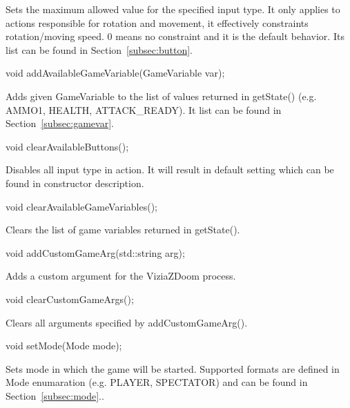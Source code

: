 Sets the maximum allowed value for the specified input type. It only applies to actions responsible for rotation and movement, it effectively constraints rotation/moving speed.
0 means no constraint and it is the default behavior. Its list can be found in Section~\ref{subsec:button}.


\vspace{20pt}
\begin{clinee}
void addAvailableGameVariable(GameVariable var);
\end{clinee}

Adds given GameVariable to the list of values returned in getState() (e.g. AMMO1, HEALTH, ATTACK\_READY). It list can be found in Section~\ref{subsec:gamevar}.


\vspace{20pt}
\begin{clinee}
void clearAvailableButtons();
\end{clinee}

Disables all input type in action. It will result in default setting which can be found in constructor description.


\vspace{20pt}
\begin{clinee}
void clearAvailableGameVariables();
\end{clinee}

Clears the list of game variables returned in getState().


\vspace{20pt}
\begin{clinee}
void addCustomGameArg(std::string arg);
\end{clinee}

Adds a custom argument for the ViziaZDoom process.


\vspace{20pt}
\begin{clinee}
void clearCustomGameArgs();
\end{clinee}

Clears all arguments specified by addCustomGameArg().


\vspace{20pt}
\begin{clinee}
void setMode(Mode mode);
\end{clinee}

Sets mode in which the game will be started. Supported formats are defined in Mode enumaration (e.g. PLAYER, SPECTATOR) and can be found in Section~\ref{subsec:mode}..


